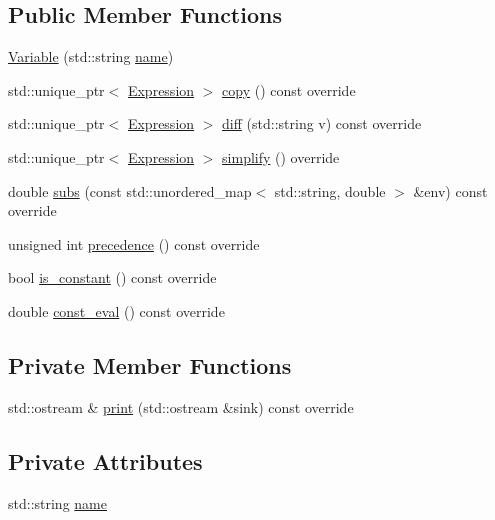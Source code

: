 \subsection*{Public Member Functions}
\begin{DoxyCompactItemize}
\item 
\hyperlink{classsymcpp_1_1Variable_abe52e6589e8189c46011530bed23f5cc}{Variable} (std\+::string \hyperlink{classsymcpp_1_1Variable_a626cca9e1586e5d60f31446a06c6203f}{name})
\item 
std\+::unique\+\_\+ptr$<$ \hyperlink{classsymcpp_1_1Expression}{Expression} $>$ \hyperlink{classsymcpp_1_1Variable_a5a434805a53a7c46e3659a8efdc7ba80}{copy} () const override
\item 
std\+::unique\+\_\+ptr$<$ \hyperlink{classsymcpp_1_1Expression}{Expression} $>$ \hyperlink{classsymcpp_1_1Variable_ae17a02824954066f4e8b1ed6ba799ff0}{diff} (std\+::string v) const override
\item 
std\+::unique\+\_\+ptr$<$ \hyperlink{classsymcpp_1_1Expression}{Expression} $>$ \hyperlink{classsymcpp_1_1Variable_afd613d28c73d738fc0cf90b70e1820bb}{simplify} () override
\item 
double \hyperlink{classsymcpp_1_1Variable_a1dfbef67a237aa2533d8dc88c378d08b}{subs} (const std\+::unordered\+\_\+map$<$ std\+::string, double $>$ \&env) const override
\item 
unsigned int \hyperlink{classsymcpp_1_1Variable_a4b998019a17f29482772f1f945398ff3}{precedence} () const override
\item 
bool \hyperlink{classsymcpp_1_1Variable_a1ccd5094922661828039f16b77974fe0}{is\+\_\+constant} () const override
\item 
double \hyperlink{classsymcpp_1_1Variable_a822c9e3e85da6e89949a9f2df7244f5c}{const\+\_\+eval} () const override
\end{DoxyCompactItemize}
\subsection*{Private Member Functions}
\begin{DoxyCompactItemize}
\item 
std\+::ostream \& \hyperlink{classsymcpp_1_1Variable_a10ce030c1648fae51534712155ffcab1}{print} (std\+::ostream \&sink) const override
\end{DoxyCompactItemize}
\subsection*{Private Attributes}
\begin{DoxyCompactItemize}
\item 
std\+::string \hyperlink{classsymcpp_1_1Variable_a626cca9e1586e5d60f31446a06c6203f}{name}
\end{DoxyCompactItemize}



